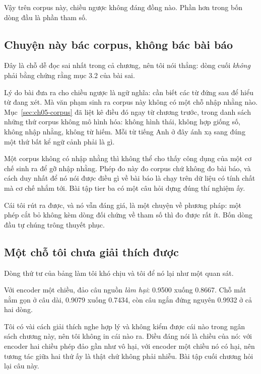 Vậy trên corpus này, chiều ngược không đáng đồng nào. Phần hơn trong bốn dòng
đầu là phần tham số.

\subsection*{Chuyện này bác corpus, không bác bài báo}

%
Đây là chỗ dễ đọc sai nhất trong cả chương, nên tôi nói thẳng: dòng cuối
\emph{không} phải bằng chứng rằng mục 3.2 của bài sai.

Lý do bài đưa ra cho chiều ngược là ngữ nghĩa: cần biết các từ đứng sau để hiểu
từ đang xét. Mà văn phạm sinh ra corpus này không có một chỗ nhập nhằng nào.
Mục~\ref{sec:ch05-corpus} đã liệt kê điều đó ngay từ chương trước, trong danh
sách những thứ corpus không mô hình hóa: không hình thái, không hợp giống số,
không nhập nhằng, không từ hiếm. Mỗi từ tiếng Anh ở đây ánh xạ sang đúng một
thứ bất kể ngữ cảnh phải là gì.

Một corpus không có nhập nhằng thì không thể cho thấy công dụng của một cơ chế
sinh ra để gỡ nhập nhằng. Phép đo này đo corpus chứ không đo bài báo, và cách
duy nhất để nó nói được điều gì về bài báo là chạy trên dữ liệu có tính chất mà
cơ chế nhắm tới. Bài tập tier ba có một câu hỏi dựng đúng thí nghiệm ấy.

Cái tôi rút ra được, và nó vẫn đáng giá, là một chuyện về phương pháp: một phép
cắt bỏ không kèm dòng đối chứng về tham số thì đo được rất ít. Bốn dòng đầu tự
chúng trông thuyết phục.

\subsection*{Một chỗ tôi chưa giải thích được}

%
Dòng thứ tư của bảng làm tôi khó chịu và tôi để nó lại như một quan sát.

Với encoder một chiều, đảo câu nguồn \emph{làm hại}: 0.9500 xuống 0.8667. Chỗ
mất nằm gọn ở câu dài, 0.9079 xuống 0.7434, còn câu ngắn đứng nguyên 0.9932 ở
cả hai dòng.

Tôi có vài cách giải thích nghe hợp lý và không kiểm được cái nào trong ngân
sách chương này, nên tôi không in cái nào ra. Điều đáng nói là chiều của nó:
với encoder hai chiều phép đảo gần như vô hại, với encoder một chiều nó có hại,
nên tương tác giữa hai thứ ấy là thật chứ không phải nhiễu. Bài tập cuối chương
hỏi lại câu này.


